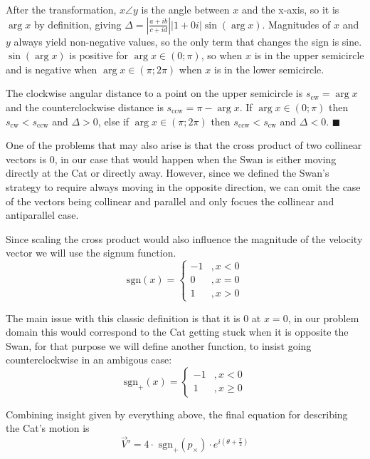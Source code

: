 \documentclass[12pt]{article}
\begin{document}
After the transformation, $x \angle y$ is the angle between $x$ and the x-axis, so it is $\arg x$ by definition, giving $\Delta = |\frac{a + ib}{c + id}| |1 + 0i| \sin (\arg x)$. Magnitudes of $x$ and $y$ always yield non-negative values, so the only term that changes the sign is sine. $\sin (\arg x)$ is positive for $\arg x \in (0; \pi)$, so when $x$ is in the upper semicircle and is negative when $\arg x \in (\pi; 2\pi)$ when $x$ is in the lower semicircle.

The clockwise angular distance to a point on the upper semicircle is $s_{\text{cw}} = \arg x$ and the counterclockwise distance is $s_\text{ccw} = \pi - \arg x$. If $\arg x \in (0; \pi)$ then $s_\text{cw} < s_\text{ccw}$ and $\Delta > 0$, else if $\arg x \in (\pi; 2\pi)$ then $s_{\text{ccw}} < s_{\text{cw}}$ and $\Delta < 0$. $\blacksquare$

One of the problems that may also arise is that the cross product of two collinear\cite{vectorterminology} vectors is $0$, in our case that would happen when the Swan is either moving directly at the Cat or directly away. However, since we defined the Swan's strategy to require always moving in the opposite direction, we can omit the case of the vectors being collinear and parallel\cite{vectorterminology} and only focues the collinear and antiparallel\cite{vectorterminology} case.

Since scaling the cross product would also influence the magnitude of the velocity vector we will use the signum function. $$\text{sgn}(x) = \left\{ 
	\begin{aligned}
		-1&, x < 0\\
		0&, x = 0\\
		1&, x > 0
	\end{aligned}
\right.$$

The main issue with this classic definition is that it is $0$ at $x = 0$, in our problem domain this would correspond to the Cat getting stuck when it is opposite the Swan, for that purpose we will define another function, to insist going counterclockwise in an ambigous case:$$\text{sgn}_+(x) = \left\{ 
	\begin{aligned}
		-1&, x < 0\\
		1&, x \geq 0
	\end{aligned}
\right.$$

Combining insight given by everything above, the final equation for describing the Cat's motion is $$
\vec{V}' = 4 \cdot \text{ sgn}_+ (p_\times) \cdot e^{i (\theta + \frac{\pi}{2})}
$$
\end{document}
